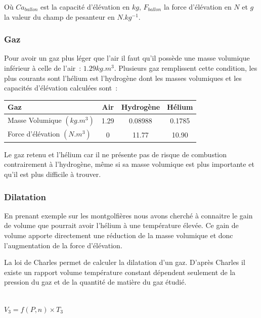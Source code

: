 \documentclass[a4paper,11pt]{article}
\begin{document}
Où $Ca_{ballon}$ est la capacité d'élévation en $kg$, $F_{ballon}$ la force d'élévation en $N$ et $g$ la valeur du champ de pesanteur en $N.kg^{-1}$.

\subsubsection{Gaz}

Pour avoir un gaz plus léger que l'air il faut qu'il possède une masse volumique inférieur à celle de l'air~: $1.29kg.m^3$. Plusieurs gaz remplissent cette condition, les plus courants sont l'hélium est l'hydrogène dont les masses volumiques et les capacités d'élévation calculées sont~:

\begin{center}
	\begin{tabular}{|l|c|c|c|}
		\hline
		Gaz & Air & Hydrogène & Hélium \\
		\hline
		Masse Volumique $(kg.m^3)$ & 1.29 & 0.08988 & 0.1785 \\
		\hline
		Force d'élévation $(N.m^3)$ & 0 & 11.77 & 10.90 \\
		\hline
	\end{tabular}
\end{center}

Le gaz retenu et l'hélium car il ne présente pas de risque de combustion contrairement à l'hydrogène, même si sa masse volumique est plus importante et qu'il est plus difficile à trouver.

\subsubsection{Dilatation}

En prenant exemple sur les montgolfières nous avons cherché à connaitre le gain de volume que pourrait avoir l'hélium à une température élevée. Ce gain de volume apporte directement une réduction de la masse volumique et donc l'augmentation de la force d'élévation.

La loi de Charles permet de calculer la dilatation d'un gaz. D'après Charles il existe un rapport volume température constant dépendent seulement de la pression du gaz et de la quantité de matière du gaz étudié.

\begin{center}
  \\
 $\displaystyle{V_3 = f(P, n) \times T_3}$
\end{center}
\end{document}
